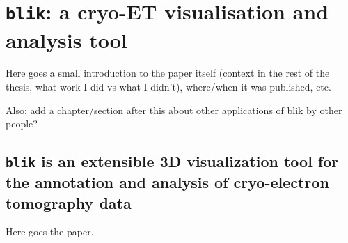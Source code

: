 \chapter{\texttt{blik}: a cryo-ET visualisation and analysis tool}

Here goes a small introduction to the paper itself (context in the rest of the thesis, what work I did vs what I didn't), where/when it was published, etc.

Also: add a chapter/section after this about other applications of blik by other people?

\section*{\texttt{blik} is an extensible 3D visualization tool for the annotation and analysis of cryo-electron tomography data}


Here goes the paper.

% 
